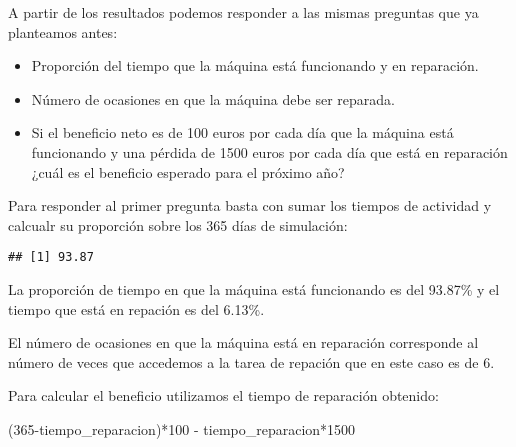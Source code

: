 \documentclass[
]{book}
\newenvironment{Shaded}{\begin{snugshade}}{\end{snugshade}}
\newcommand{\DecValTok}[1]{\textcolor[rgb]{0.00,0.00,0.81}{#1}}
\newcommand{\FunctionTok}[1]{\textcolor[rgb]{0.00,0.00,0.00}{#1}}
\newcommand{\NormalTok}[1]{#1}
\newcommand{\OtherTok}[1]{\textcolor[rgb]{0.56,0.35,0.01}{#1}}
\newcommand{\SpecialCharTok}[1]{\textcolor[rgb]{0.00,0.00,0.00}{#1}}
\providecommand{\tightlist}{%
  \setlength{\itemsep}{0pt}\setlength{\parskip}{0pt}}
\theoremstyle{definition}
\theoremstyle{definition}
\theoremstyle{definition}
\theoremstyle{definition}
\theoremstyle{remark}
\begin{document}
A partir de los resultados podemos responder a las mismas preguntas que ya planteamos antes:

\begin{itemize}
\tightlist
\item
  Proporción del tiempo que la máquina está funcionando y en reparación.
\item
  Número de ocasiones en que la máquina debe ser reparada.
\item
  Si el beneficio neto es de 100 euros por cada día que la máquina está funcionando y una pérdida de 1500 euros por cada día que está en reparación ¿cuál es el beneficio esperado para el próximo año?
\end{itemize}

Para responder al primer pregunta basta con sumar los tiempos de actividad y calcualr su proporción sobre los 365 días de simulación:

\begin{Shaded}
\end{Shaded}

\begin{verbatim}
## [1] 93.87
\end{verbatim}

La proporción de tiempo en que la máquina está funcionando es del 93.87\% y el tiempo que está en repación es del 6.13\%.

El número de ocasiones en que la máquina está en reparación corresponde al número de veces que accedemos a la tarea de repación que en este caso es de 6.

Para calcular el beneficio utilizamos el tiempo de reparación obtenido:

\begin{Shaded}
\begin{Highlighting}[]
\NormalTok{(}\DecValTok{365}\SpecialCharTok{{-}}\NormalTok{tiempo\_reparacion)}\SpecialCharTok{*}\DecValTok{100} \SpecialCharTok{{-}}\NormalTok{ tiempo\_reparacion}\SpecialCharTok{*}\DecValTok{1500}
\end{Highlighting}
\end{Shaded}
\end{document}
